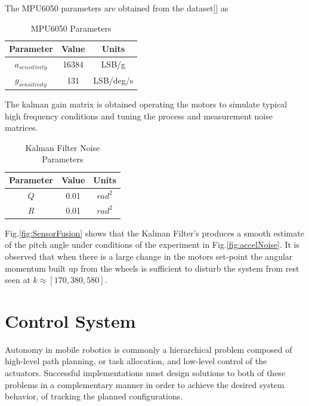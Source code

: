         The MPU6050 parameters are obtained from the dataset[] as 
        \begin{table}[H]
            \centering
            \begin{tabular}{|c|c|c|}
                \hline
                Parameter & Value & Units \\
                \hline
                $a_{sensitivity}$ & 16384 & LSB/g \\
                $g_{sensitivity}$ & 131 & LSB/deg/s \\
                \hline
            \end{tabular}
            \caption{MPU6050 Parameters}
        \end{table}
        The kalman gain matrix is obtained operating the motors to simulate typical high frequency conditions 
        and tuning the process and measurement noise matrices.
        \begin{table}[H]
            \centering
            \begin{tabular}{|c|c|c|}
                \hline
                Parameter & Value & Units \\
                \hline
                $Q$ & 0.01 & $rad^2$ \\
                $R$ & 0.01 & $rad^2$ \\
                \hline
            \end{tabular}
            \caption{Kalman Filter Noise Parameters}
        \end{table}

       
        Fig.\ref{fig:SensorFusion} shows that the Kalman Filter's produces a smooth estimate of the pitch angle
        under conditions of the experiment in Fig.\ref{fig:accelNoise}. It is observed that when there is a 
        large change in the motors set-point  the angular momentum built up from the wheels is sufficient to 
        disturb the system from rest seen at $k \approx [170, 380, 580]$.
        \pagebreak{}

    \section{Control System}
        Autonomy in mobile robotics is commonly a hierarchical problem composed of high-level path planning, 
        or task allocation, and low-level control of the actuators.  
        Successful implementations must design solutions to both of these problems in a complementary manner in order 
        to achieve the desired system behavior, of tracking the planned configurations.
            
